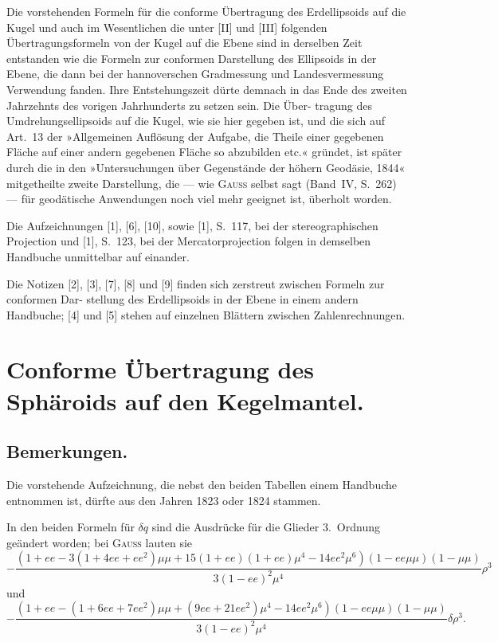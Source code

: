 \documentclass[12pt,a4paper]{article}
\theoremstyle{plain}
\theoremstyle{definition}
\theoremstyle{remark}
\newcommand{\ee}{\mathit{ee}}
\begin{document}
Die vorstehenden Formeln für die conforme Übertragung des Erdellipsoids auf die Kugel und auch
im Wesentlichen die unter [II] und [III] folgenden Übertragungsformeln von der Kugel auf die Ebene sind
in derselben Zeit entstanden wie die Formeln zur conformen Darstellung des Ellipsoids in der Ebene, die
dann bei der hannoverschen Gradmessung und Landesvermessung Verwendung fanden. Ihre Entstehungszeit
dürte demnach in das Ende des zweiten Jahrzehnts des vorigen Jahrhunderts zu setzen sein. Die Über-
tragung des Umdrehungsellipsoids auf die Kugel, wie sie hier gegeben ist, und die sich auf Art.~13 der
»Allgemeinen Auflösung der Aufgabe, die Theile einer gegebenen Fläche auf einer andern gegebenen Fläche
so abzubilden etc.« gründet, ist später durch die in den »Untersuchungen über Gegenstände der höhern
Geodäsie, 1844« mitgetheilte zweite Darstellung, die --- wie \textsc{Gauss} selbst sagt (Band~IV, S.~262) --- für
geodätische Anwendungen noch viel mehr geeignet ist, überholt worden.

Die Aufzeichnungen [1], [6], [10], sowie [1], S.~117, bei der stereographischen Projection und [1], S.~123,
bei der Mercatorprojection folgen in demselben Handbuche unmittelbar auf einander.

Die Notizen [2], [3], [7], [8] und [9] finden sich zerstreut zwischen Formeln zur conformen Dar-
stellung des Erdellipsoids in der Ebene in einem andern Handbuche; [4] und [5] stehen auf einzelnen
Blättern zwischen Zahlenrechnungen.

\newpage
\section*{Conforme Übertragung des Sphäroids auf den Kegelmantel.}

\newpage
\subsection*{Bemerkungen.}

Die vorstehende Aufzeichnung, die nebst den beiden Tabellen einem Handbuche entnommen ist,
dürfte aus den Jahren 1823 oder 1824 stammen.

In den beiden Formeln für $\delta q$ sind die Ausdrücke für die Glieder 3.~Ordnung geändert worden; bei
\textsc{Gauss} lauten sie
\[
-\frac{(1 + \ee - 3(1 + 4\ee + \ee^2)\mu\mu + 15(1 + \ee)(1 + \ee)\mu^4 - 14\ee^2\mu^6)(1 - \ee\mu\mu)(1 - \mu\mu)}{3(1 - \ee)^2\mu^4}\rho^3
\]
und
\[
-\frac{(1 + \ee - (1 + 6\ee + 7\ee^2)\mu\mu + (9\ee + 21\ee^2)\mu^4 - 14\ee^2\mu^6)(1 - \ee\mu\mu)(1 - \mu\mu)}{3(1 - \ee)^2\mu^4}\delta\rho^3.
\]
\end{document}
